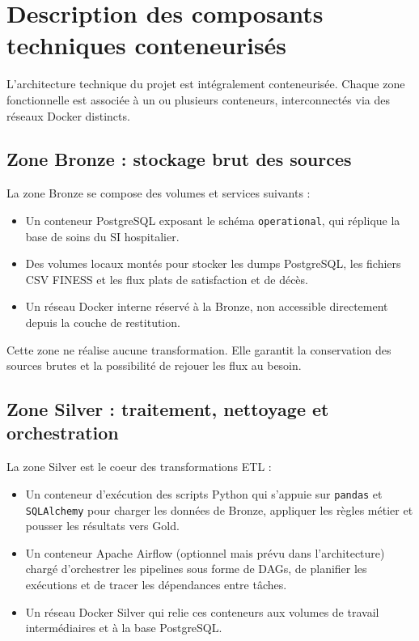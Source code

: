 \documentclass[12pt, a4paper]{report}
\begin{document}
\section{Description des composants techniques conteneurisés}

L'architecture technique du projet est intégralement conteneurisée. Chaque zone fonctionnelle est associée à un ou plusieurs conteneurs, interconnectés via des réseaux Docker distincts.

\subsection{Zone Bronze : stockage brut des sources}

La zone Bronze se compose des volumes et services suivants :

\begin{itemize}[label=\textcolor{chuBlue}{\textbullet}]
  \item Un conteneur PostgreSQL exposant le schéma \texttt{operational}, qui réplique la base de soins du SI hospitalier.
  \item Des volumes locaux montés pour stocker les dumps PostgreSQL, les fichiers CSV FINESS et les flux plats de satisfaction et de décès.
  \item Un réseau Docker interne réservé à la Bronze, non accessible directement depuis la couche de restitution.
\end{itemize}

Cette zone ne réalise aucune transformation. Elle garantit la conservation des sources brutes et la possibilité de rejouer les flux au besoin.

\subsection{Zone Silver : traitement, nettoyage et orchestration}

La zone Silver est le coeur des transformations ETL :

\begin{itemize}[label=\textcolor{chuBlue}{\textbullet}]
  \item Un conteneur d'exécution des scripts Python qui s'appuie sur \texttt{pandas} et \texttt{SQLAlchemy} pour charger les données de Bronze, appliquer les règles métier et pousser les résultats vers Gold.
  \item Un conteneur Apache Airflow (optionnel mais prévu dans l'architecture) chargé d'orchestrer les pipelines sous forme de DAGs, de planifier les exécutions et de tracer les dépendances entre tâches.
  \item Un réseau Docker Silver qui relie ces conteneurs aux volumes de travail intermédiaires et à la base PostgreSQL.
\end{itemize}
\end{document}
